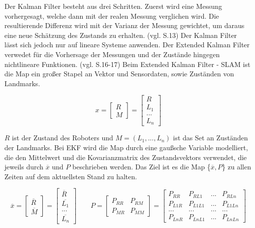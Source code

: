 Der Kalman Filter besteht aus drei Schritten. Zuerst wird eine Messung vorhergesagt, welche dann mit der realen Messung verglichen wird. Die resultierende Differenz wird mit der Varianz der Messung gewichtet, um daraus eine neue Schätzung des Zustands zu erhalten. (vgl. \cite{slam_studi} S.13) Der Kalman Filter lässt sich jedoch nur auf lineare Systeme anwenden. Der Extended Kalman Filter verwedet für die Vorhersage der Messungen und der Zustände hingegen nichtlineare Funktionen. (vgl. \cite{slam_studi} S.16-17) Beim Extended Kalman Filter - SLAM ist die Map ein großer Stapel an Vektor und Sensordaten, sowie Zuständen von Landmarks.

\begin{equation}
  x =  \begin{bmatrix}
		R\\
		M
     	\end{bmatrix}
     = \begin{bmatrix}
		R\\
		L_1\\
		...\\
		L_n
     	\end{bmatrix}
\end{equation}

\( R\) ist der Zustand des Roboters und \( M = (L_1, ..., L_n)\)  ist das Set an Zuständen der Landmarks.
Bei EKF wird die Map durch eine gaußsche Variable modelliert, die den Mittelwert und die Kovarianzmatrix des Zustandsvektors verwendet, die jeweils durch \(\overline{x}\) und \(P\) beschrieben werden. Das Ziel ist es die Map \{\(\overline{x}, P\)\} zu allen Zeiten auf dem aktuellsten Stand zu halten.


\begin{equation}
  \overline{x} =  
  		\begin{bmatrix}
		\overline{R}\\
		\overline{M}
     	\end{bmatrix}
     = 
     	\begin{bmatrix}
		\overline{R}\\
		\overline{L_1}\\
		...\\
		\overline{L_n}
     	\end{bmatrix}
     	\quad\quad
     P = 
     	\begin{bmatrix}
		P_{RR} & P_{RM}\\
		P_{MR} & P_{MM}
     	\end{bmatrix}
     = 
     	\begin{bmatrix}
		P_{RR} & P_{RL1} & ... & P_{RLn}\\
		P_{L1R} & P_{L1L1} & ... & P_{L1Ln}\\
		... & ... & ... & ... \\
		P_{LnR} & P_{LnL1} & ... & P_{LnLn}
     	\end{bmatrix}
\end{equation}

